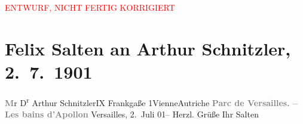 
\begin{center}
            \textcolor{red}{ENTWURF, NICHT FERTIG KORRIGIERT}
                      \end{center}
            
         \renewcommand{\erwaehnteOrte}{Orte: Bosquet des Bains d'Apollon, Frankgasse, IX., Alsergrund, Jardin de Versailles, Versailles, Wien, Österreich}
         \renewcommand{\erwaehnteWerke}{}
               \section[Felix Salten an Arthur Schnitzler, 2. 7. 1901]{ Felix Salten an Arthur Schnitzler, 2. 7. 1901}\nopagebreak{}\rehead{ }\begin{ledgroupsized}[t]{13cm}\normalsize\beginnumbering \toendnotes[C]{\smallbreak\pagebreak[2]} 
\pstart{}{\pb}\textcolor{gray}{\textbf{M}}r D\textsuperscript{r} Arthur
                  Schnitzler\pend{}\pstart{}IX Frankgaße 1\pend{}\pstart{}Vienne\pend{}\pstart{}Autriche\pend{}{\bigskip}\pstart
           \noindent{}\centering{}{\pb}\textcolor{gray}{\textbf{Parc de Versailles. – Les bains d’Apollon}}\pend
           \pstart
           \raggedleft{}Versailles,  2. Juli
                  01–\pend
           \pstart
           Herzl. Grüße Ihr\pend
           \pstart \spacefill\mbox{Salten}\pend{}
         
         \endnumbering{}\end{ledgroupsized}\begin{anhang}\end{anhang}\newcommand{\dateiname}{L03317}\newcommand{\titel}{Felix Salten an Arthur Schnitzler, 2. 7. 1901}\newcommand{\editorInnen}{Martin Anton Müller und Laura Untner}
      